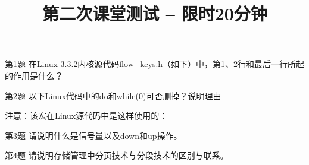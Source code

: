 \documentclass[xcolor=svgnames]{beamer}
\begin{document}
\begin{CJK*}{UTF8}{gbsn}


\title{第二次课堂测试 -- 限时20分钟}

\maketitle

\begin{frame}{第1题}
在Linux 3.3.2内核源代码flow\_keys.h（如下）中，第1、2行和最后一行所起的作用是什么？
\lstset{language=C, frame=trbl}


\end{frame}

\begin{frame}{第2题}
以下Linux代码中的do和while(0)可否删掉？说明理由
\lstset{language=C, frame=trbl}

\alert{注意}：该宏在Linux源代码中是这样使用的：
\lstset{language=C, frame=trbl}


\end{frame}

\begin{frame}{第3题}
请说明什么是信号量以及down和up操作。
\end{frame}

\begin{frame}{第4题}
请说明存储管理中分页技术与分段技术的区别与联系。
\end{frame}

\end{CJK*}
\end{document}

